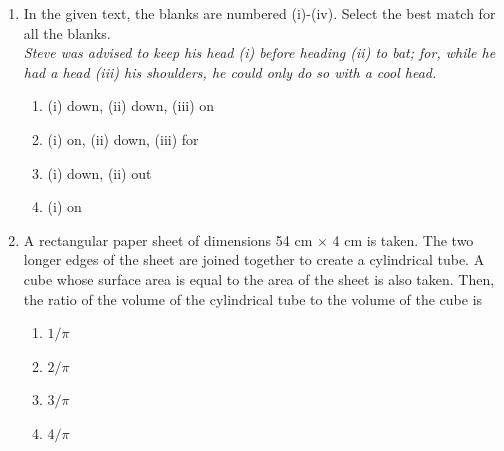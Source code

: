 \documentclass[journal]{IEEEtran}
\theoremstyle{remark}
\begin{document}
\begin{enumerate}[resume]
\item In the given text, the blanks are numbered (i)-(iv). Select the best match for all the blanks. \hfill{}\\
\textit{Steve was advised to keep his head \underline{\hspace{0.5cm}}(i)\underline{\hspace{0.5cm}} before heading \underline{\hspace{0.5cm}}(ii)\underline{\hspace{0.5cm}} to bat; for, while he had a head \underline{\hspace{0.5cm}}(iii)\underline{\hspace{0.5cm}} his shoulders, he could only do so with a cool head.} 

\begin{enumerate}
    \item (i) down, (ii) down, (iii) on
    \item (i) on, (ii) down, (iii) for
    \item (i) down, (ii) out
    \item (i) on
\end{enumerate}

\item A rectangular paper sheet of dimensions 54 cm $\times$ 4 cm is taken. The two longer edges of the sheet are joined together to create a cylindrical tube. A cube whose surface area is equal to the area of the sheet is also taken. Then, the ratio of the volume of the cylindrical tube to the volume of the cube is \hfill{}
\begin{multicols}{4}
\begin{enumerate}
\item $1/\pi$
\item $2/\pi$
\item $3/\pi$
\item $4/\pi$
\end{enumerate}
\end{multicols}


\end{enumerate}
\end{document}
